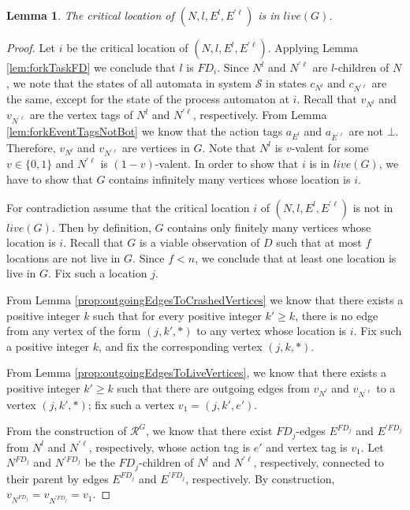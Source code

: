 \documentclass[11pt]{article}
\numberwithin{theorem}{section}
\newtheorem{lemma}[theorem]{Lemma}
\begin{document}
\begin{lemma}\label{thm:forkCriticalProcessCorrect}
The critical location of $(N,l,E^l,E^{\prime \ell})$ is in $live(G)$.
\end{lemma}
\begin{proof}
 Let $i$ be the critical location of $(N,l,E^l,E^{\prime \ell})$. Applying Lemma \ref{lem:forkTaskFD} we conclude that $l$ is $FD_i$. Since $N^l$ and $N^{\prime \ell}$ are $l$-children of $N$, we note that the states of all automata in system $\mathcal{S}$ in states $c_{N^l}$ and $c_{N^{\prime \ell}}$ are the same, except for the state of the process automaton at $i$. Recall that $v_{N^l}$ and $v_{N^{\prime \ell}}$ are the vertex tags of $N^l$ and $N^{\prime \ell}$, respectively. From Lemma \ref{lem:forkEventTagsNotBot} we know that the action tags $a_{E^l}$ and $a_{E^{\prime \ell}}$ are not $\bot$. Therefore, $v_{N^l}$ and $v_{N^{\prime \ell}}$ are vertices in $G$.
Note that $N^l$ is $v$-valent for some $v\in\{0,1\}$ and $N^{\prime \ell}$ is $(1-v)$-valent. In order to show that $i$ is in $live(G)$, we have to show that $G$ contains infinitely many vertices whose location is $i$.


For contradiction assume that the critical location $i$ of $(N,l,E^l,E^{\prime \ell})$ is not in $live(G)$. Then by definition, $G$ contains only finitely many vertices whose location is $i$. 
Recall that $G$ is a viable observation of $D$ such that at most $f$ locations are not live in $G$. Since $f < n$,
we conclude that at least one location is live in $G$. Fix such a location $j$.

From Lemma \ref{prop:outgoingEdgesToCrashedVertices} we know that there exists a positive integer $k$ such that for every positive integer $k' \geq k$, there is no edge from any vertex of the form $(j,k',*)$ to any vertex whose location is $i$. Fix such a positive integer $k$, and fix the corresponding vertex $(j,k,*)$.

From Lemma \ref{prop:outgoingEdgesToLiveVertices}, we know that there exists a positive integer $k' \geq k$ such that there are outgoing edges from $v_{N^l}$ and $v_{N^{\prime \ell}}$ to a vertex $(j,k',*)$; fix such a vertex $v_1 = (j,k',e')$.

From the construction of $\mathcal{R}^G$, we know that there exist $FD_j$-edges $E^{FD_j}$ and $E^{\prime FD_j}$ from $N^l$ and $N^{\prime \ell}$, respectively, whose action tag is $e'$ and vertex tag is $v_1$. Let $N^{FD_j}$ and $N^{\prime FD_j}$ be the $FD_j$-children of $N^l$ and $N^{\prime \ell}$, respectively, connected to their parent by edges $E^{FD_j}$ and $E^{\prime FD_j}$, respectively. By construction, $v_{N^{FD_j}} = v_{N^{\prime FD_j}} = v_1$. 




\end{proof}
\end{document}
